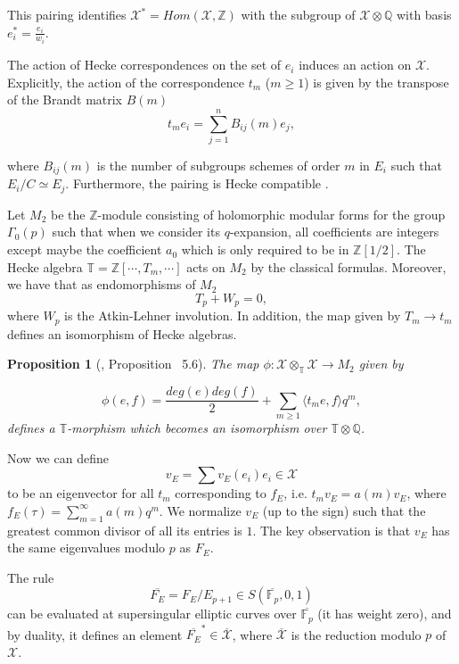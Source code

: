 \documentclass[13pt]{amsart}
\newtheorem{proposition}[theorem]{Proposition}
\theoremstyle{remark}
\numberwithin{theorem}{section} \numberwithin{equation}{section}
\begin{document}
This pairing identifies ${\mathcal{X}}^{*}=Hom({\mathcal{X}},{\mathbb{Z}})$ with the subgroup of ${\mathcal{X}} \otimes {\mathbb{Q}}$ with basis $e^{*}_{i}=\frac{e_{i}}{w_{i}}$.

The action of Hecke correspondences on the set of $e_i$ induces an action on ${\mathcal{X}}$. Explicitly, the action of the correspondence $t_m$ ($m\ge 1$) is given by the transpose  of the Brandt matrix $B(m)$
\[
t_m e_i = \sum_{j=1}^n B_{ij}(m)e_j,
\]

where $B_{ij}(m)$ is the number of subgroups schemes of order $m$ in $E_{i}$ such that $E_{i}/C \simeq E_j$.
Furthermore, the pairing is Hecke compatible \cite[Proposition ~4.6]{Gross}.

Let $M_2$ be the ${\mathbb{Z}}$-module consisting of holomorphic modular forms for the 
group $\Gamma_{0}(p)$ such that when we consider its $q$-expansion, all 
coefficients are integers except maybe the coefficient $a_0$ which is only 
required to be in ${\mathbb{Z}}[1/2]$.
 The Hecke algebra $\mathbb{T}={\mathbb{Z}}[ \cdots , T_m,  \cdots ]$ acts on $M_2$  by the classical formulas. Moreover, we have that as endomorphisms of
$M_2$ 
\[T_{p}+W_{p}=0, \] where $W_p$ is the Atkin-Lehner involution. In addition, 
the map given by $T_m \rightarrow  t_m$ defines an isomorphism of Hecke 
algebras.

\begin{proposition}[\cite{Gross}, Proposition ~5.6]\label{prop:Gross}
The map $\phi: {\mathcal{X}} \otimes_{\mathbb{T}} {\mathcal{X}} \rightarrow M_2$ given by

 \[ \phi(e,f)=\frac{deg(e)deg(f)}{2} + \sum_{m \ge 1}  \langle t_{m}e,f \rangle q^m, \]
  defines a $\mathbb{T}$-morphism which becomes an isomorphism over $\mathbb{T} \otimes {\mathbb{Q}}$.
\end{proposition}

Now we can define 
\[v_E=\sum v_E(e_i)e_i\in {\mathcal{X}} \] to be an eigenvector for all $t_m$ corresponding to $f_E$, i.e. $t_m v_E= a(m) v_E$, where $f_E(\tau)=\sum_{m=1}^\infty a(m)q^m$. We normalize $v_E$ (up to the sign) such that the greatest common divisor of all its entries is $1$. The key observation is that $v_E$ has the same eigenvalues modulo $p$ as $F_{E}$.

The rule \[ \overline{F_{E}}= F_{E}/E_{p+1}  \in {S}(\overline{\mathbb{F}_p},0,1) \] can be evaluated at supersingular elliptic curves over
 $\overline{\mathbb{F}_p}$ (it has weight zero), and by duality, it defines an element $\overline{F_{E}}^{*} \in \overline{\mathcal{X}}$, where $\overline{\mathcal{X}}$ is the reduction modulo $p$ of ${\mathcal{X}}$. 
 
\end{document}
